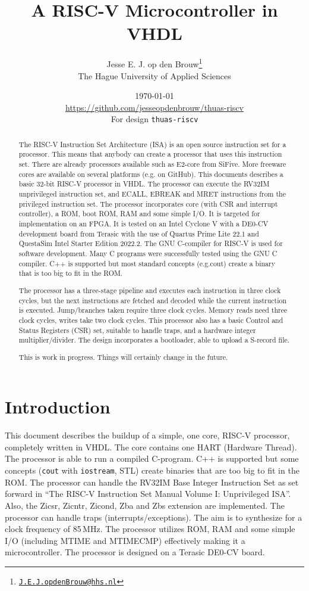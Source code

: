 \documentclass[12pt]{article}
\author{Jesse E. J. op den Brouw\thanks{\href{mailto:J.E.J.opdenBrouw@hhs.nl}{\texttt{J.E.J.opdenBrouw@hhs.nl}}}\\[2ex]The Hague University of Applied Sciences}
\title{A RISC-V Microcontroller in VHDL}
\date{\today\\[2ex]\normalsize\url{https://github.com/jesseopdenbrouw/thuas-riscv}\\[2ex]For design \texttt{thuas-riscv}}
\begin{document}
\maketitle

\vfill
\begin{abstract}
\baselineskip
\noindent
The RISC-V Instruction Set Architecture (ISA) is an open source instruction set for a processor. This means that anybody can create a processor that uses this instruction set. There are already processors available such as E2-core from SiFive. More freeware cores are available on several platforms (e.g. on GitHub). This documents describes a basic 32-bit RISC-V processor in VHDL. The processor can execute the RV32IM unprivileged instruction set, and ECALL, EBREAK and MRET instructions from the privileged instruction set. The processor incorporates core (with CSR and  interrupt controller), a ROM, boot ROM, RAM and some simple I/O. It is targeted for implementation on an FPGA. It is tested on an Intel Cyclone V with a DE0-CV development board from Terasic with the use of Quartus Prime Lite 22.1 and QuestaSim Intel Starter Edition 2022.2. The GNU C-compiler for RISC-V is used for software development. Many C programs were successfully tested using the GNU C compiler. C++ is supported but most standard concepts (e.g.\@ cout) create a binary that is too big to fit in the ROM.

\noindent
The processor has a three-stage pipeline and executes each instruction in three clock cycles, but the next instructions are fetched and decoded while the current instruction is executed. Jump/branches taken require three clock cycles. Memory reads need three clock cycles, writes take two clock cycles. This processor also has a basic Control and Status Registers (CSR) set, suitable to handle traps, and a hardware integer multiplier/divider. The design incorporates a bootloader, able to upload a S-record file.

\noindent
This is work in progress. Things will certainly change in the future.
\end{abstract}
\vfill

\clearpage
\tableofcontents

\clearpage
\section{Introduction}
This document describes the buildup of a simple, one core, RISC-V processor, completely written in VHDL. The core contains one HART (Hardware Thread). The processor is able to run a compiled C-program. C++ is supported but some concepts (\texttt{cout} with \texttt{iostream}, STL) create binaries that are too big to fit in the ROM. The processor can handle the RV32IM Base Integer Instruction Set as set forward in ``The RISC-V Instruction Set Manual Volume I: Unprivileged ISA''. Also, the Zicsr, Zicntr, Zicond, Zba and Zbs extension are implemented. The processor can handle traps (interrupts/exceptions). The aim is to synthesize for a clock frequency of 85\,MHz. The processor utilizes ROM, RAM and some simple I/O (including MTIME and MTIMECMP) effectively making it a microcontroller. The processor is designed on a Terasic DE0-CV board.
\end{document}
